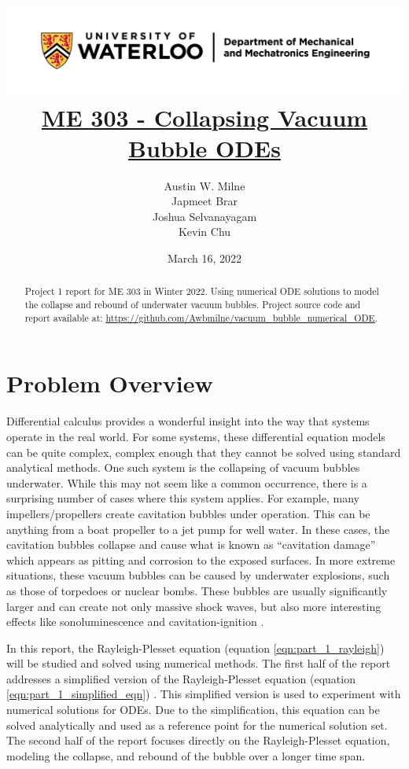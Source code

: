 \documentclass[12pt]{article}
\title{
    \includegraphics[width=\linewidth]{resources/uwaterloo_mechanical_and_mechatronics_engineering/UWaterloo_Mechanical_Mechatronics_Eng_Logo_horiz_rgb.png}
    \\[1cm]
    \underline{\bf{ME 303 - Collapsing Vacuum Bubble ODEs}}
}
\author{
    Austin W. Milne\\
    Japmeet Brar\\
    Joshua Selvanayagam\\
    Kevin Chu
}
\date{March 16, 2022}
\begin{document}
\maketitle
\vfill
\begin{abstract}
    Project 1 report for ME 303 in Winter 2022. Using numerical ODE solutions to model the collapse and rebound of underwater vacuum bubbles. Project source code and report available at:
    \underline{\url{https://github.com/Awbmilne/vacuum_bubble_numerical_ODE}}.
\end{abstract}

\clearpage
{}

\tableofcontents

\clearpage
\listoftables
\listoffigures
\lstlistoflistings

\clearpage
{}
\section{Problem Overview}

Differential calculus provides a wonderful insight into the way that systems operate in the real world. For some systems, these differential equation models can be quite complex, complex enough that they cannot be solved using standard analytical methods. One such system is the collapsing of vacuum bubbles underwater. While this may not seem like a common occurrence, there is a surprising number of cases where this system applies. For example, many impellers/propellers create cavitation bubbles under operation. This can be anything from a boat propeller to a jet pump for well water. In these cases, the cavitation bubbles collapse and cause what is known as ``cavitation damage'' \cite{askeland-6th} which appears as pitting and corrosion to the exposed surfaces. In more extreme situations, these vacuum bubbles can be caused by underwater explosions, such as those of torpedoes or nuclear bombs. These bubbles are usually significantly larger and can create not only massive shock waves, but also more interesting effects like sonoluminescence \cite{single_bbl_sono} and cavitation-ignition \cite{cavitation_ign}.

In this report, the Rayleigh-Plesset equation (equation \ref{eqn:part_1_rayleigh}) \cite{rayleigh-eqn} will be studied and solved using numerical methods. The first half of the report addresses a simplified version of the Rayleigh-Plesset equation (equation \ref{eqn:part_1_simplified_eqn}) \cite{simplified_rayleigh}. This simplified version is used to experiment with numerical solutions for ODEs. Due to the simplification, this equation can be solved analytically and used as a reference point for the numerical solution set. The second half of the report focuses directly on the Rayleigh-Plesset equation, modeling the collapse, and rebound of the bubble over a longer time span.
\end{document}
